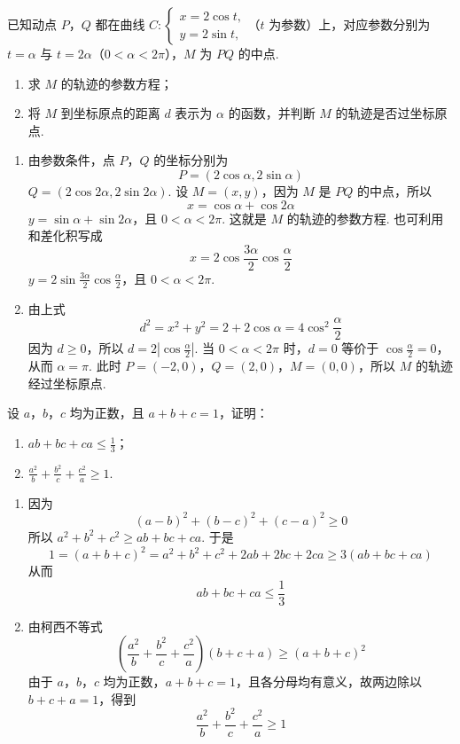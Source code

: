 \begin{problem}
已知动点 \(P\)，\(Q\) 都在曲线 \(C: \begin{cases}
x = 2\cos t,\\
y = 2\sin t,
\end{cases}\)（\(t\) 为参数）上，对应参数分别为 \(t = \alpha\) 与 \(t = 2\alpha\)（\(0 < \alpha < 2\pi\)），\(M\) 为 \(PQ\) 的中点.
\begin{enumerate}
\item 求 \(M\) 的轨迹的参数方程；
\item 将 \(M\) 到坐标原点的距离 \(d\) 表示为 \(\alpha\) 的函数，并判断 \(M\) 的轨迹是否过坐标原点.
\end{enumerate}
\end{problem}

\begin{solution}
\begin{enumerate}
\item 由参数条件，点 \(P\)，\(Q\) 的坐标分别为
\[
P=(2\cos\alpha,2\sin\alpha)
\]
\(Q=(2\cos2\alpha,2\sin2\alpha)\).
设 \(M=(x,y)\)，因为 \(M\) 是 \(PQ\) 的中点，所以
\[
x=\cos\alpha+\cos2\alpha
\]
\(y=\sin\alpha+\sin2\alpha\)，且 \(0<\alpha<2\pi\).
这就是 \(M\) 的轨迹的参数方程. 也可利用和差化积写成
\[
x=2\cos\frac{3\alpha}{2}\cos\frac\alpha2
\]
\(y=2\sin\frac{3\alpha}{2}\cos\frac\alpha2\)，且 \(0<\alpha<2\pi\).
\item 由上式
\[
d^2=x^2+y^2=2+2\cos\alpha=4\cos^2\frac\alpha2
\]
因为 \(d\geqslant0\)，所以 \(d=2\left|\cos\frac\alpha2\right|\).
当 \(0<\alpha<2\pi\) 时，\(d=0\) 等价于 \(\cos\frac\alpha2=0\)，从而 \(\alpha=\pi\). 此时 \(P=(-2,0)\)，\(Q=(2,0)\)，\(M=(0,0)\)，所以 \(M\) 的轨迹经过坐标原点.
\end{enumerate}
\end{solution}

\begin{problem}
设 \(a\)，\(b\)，\(c\) 均为正数，且 \(a + b + c = 1\)，证明：
\begin{enumerate}
\item \(ab + bc + ca \leqslant \frac{1}{3}\)；
\item \(\frac{a^2}{b} + \frac{b^2}{c} + \frac{c^2}{a} \geqslant 1\).
\end{enumerate}
\end{problem}

\begin{solution}
\begin{enumerate}
\item 因为
\[
(a-b)^2+(b-c)^2+(c-a)^2\geqslant0
\]
所以 \(a^2+b^2+c^2\geqslant ab+bc+ca\). 于是
\[
1=(a+b+c)^2=a^2+b^2+c^2+2ab+2bc+2ca\geqslant3(ab+bc+ca)
\]
从而
\[
ab+bc+ca\leqslant\frac13
\]
\item 由柯西不等式
\[
\left(\frac{a^2}{b}+\frac{b^2}{c}+\frac{c^2}{a}\right)(b+c+a)\geqslant(a+b+c)^2
\]
由于 \(a\)，\(b\)，\(c\) 均为正数，\(a+b+c=1\)，且各分母均有意义，故两边除以 \(b+c+a=1\)，得到
\[
\frac{a^2}{b}+\frac{b^2}{c}+\frac{c^2}{a}\geqslant1
\]
\end{enumerate}
\end{solution}
